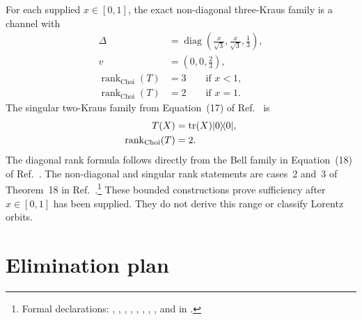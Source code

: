 \documentclass{article}
\begin{document}
For each supplied $x\in[0,1]$, the exact non-diagonal three-Kraus family is a
channel with
\begin{align}
    \Delta
        &=\operatorname{diag}
          \left(\frac{x}{\sqrt3},\frac{x}{\sqrt3},\frac13\right),
    \label{eq:wolf_prop2_11_lorentz_scalar_filtering_gap_nondiagonal_delta}\\
    v
        &=\left(0,0,\frac23\right),
    \label{eq:wolf_prop2_11_lorentz_scalar_filtering_gap_nondiagonal_shift}\\
    \operatorname{rank}_{\mathrm{Choi}}(T)
        &=3
        \qquad\text{if }x<1,
    \label{eq:wolf_prop2_11_lorentz_scalar_filtering_gap_nondiagonal_rank_three}\\
    \operatorname{rank}_{\mathrm{Choi}}(T)
        &=2
        \qquad\text{if }x=1.
    \label{eq:wolf_prop2_11_lorentz_scalar_filtering_gap_nondiagonal_rank_two}
\end{align}
The singular two-Kraus family from Equation~(17) of
Ref.~\cite{VerstraeteVerschelde2002QuantumChannels} is
\begin{align}
    T(X)
        &=\operatorname{tr}(X)|0\rangle\!\langle 0|,
    \label{eq:wolf_prop2_11_lorentz_scalar_filtering_gap_singular_map}\\
    \operatorname{rank}_{\mathrm{Choi}}(T)
        &=2.
    \label{eq:wolf_prop2_11_lorentz_scalar_filtering_gap_singular_rank}
\end{align}
The diagonal rank formula follows directly from the Bell family in
Equation~(18) of
Ref.~\cite{VerstraeteVerschelde2002QuantumChannels}. The non-diagonal and
singular rank statements are cases~2 and~3 of Theorem~18 in
Ref.~\cite{WolfCirac2008Dividing}.\footnote{Formal declarations:
,
,
,
,
,
,
,
, and
 in
.}
These bounded constructions prove sufficiency after $x\in[0,1]$ has been
supplied. They do not derive this range or classify Lorentz orbits.

\section{Elimination plan}
\end{document}
